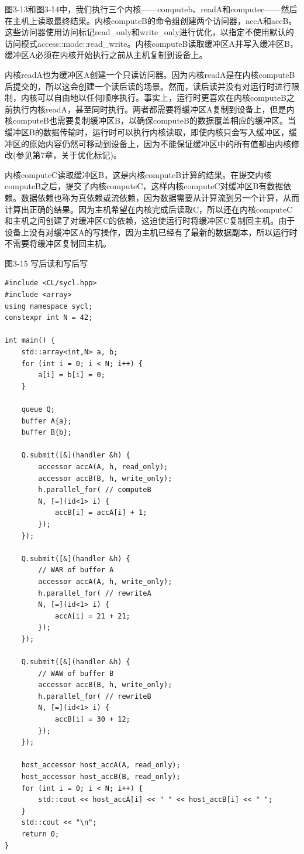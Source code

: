 图3-13和图3-14中，我们执行三个内核——computeb、readA和computec——然后在主机上读取最终结果。内核computeB的命令组创建两个访问器，accA和accB。这些访问器使用访问标记read\_only和write\_only进行优化，以指定不使用默认的访问模式access::mode::read\_write。内核computeB读取缓冲区A并写入缓冲区B，缓冲区A必须在内核开始执行之前从主机复制到设备上。\par

内核readA也为缓冲区A创建一个只读访问器。因为内核readA是在内核computeB后提交的，所以这会创建一个读后读的场景。然而，读后读并没有对运行时进行限制，内核可以自由地以任何顺序执行。事实上，运行时更喜欢在内核computeB之前执行内核readA，甚至同时执行。两者都需要将缓冲区A复制到设备上，但是内核computeB也需要复制缓冲区B，以确保computeB的数据覆盖相应的缓冲区。当缓冲区B的数据传输时，运行时可以执行内核读取，即使内核只会写入缓冲区，缓冲区的原始内容仍然可移动到设备上，因为不能保证缓冲区中的所有值都由内核修改(参见第7章，关于优化标记)。\par

内核computeC读取缓冲区B，这是内核computeB计算的结果。在提交内核computeB之后，提交了内核computeC，这样内核computeC对缓冲区B有数据依赖。数据依赖也称为真依赖或流依赖，因为数据需要从计算流到另一个计算，从而计算出正确的结果。因为主机希望在内核完成后读取C，所以还在内核computeC和主机之间创建了对缓冲区C的依赖，这迫使运行时将缓冲区C复制回主机。由于设备上没有对缓冲区A的写操作，因为主机已经有了最新的数据副本，所以运行时不需要将缓冲区复制回主机。\par

\hspace*{\fill} \par %
图3-15 写后读和写后写
\begin{lstlisting}[caption={}]
#include <CL/sycl.hpp>
#include <array>
using namespace sycl;
constexpr int N = 42;

int main() {
	std::array<int,N> a, b;
	for (int i = 0; i < N; i++) {
		a[i] = b[i] = 0;
	}

	queue Q;
	buffer A{a};
	buffer B{b};
	
	Q.submit([&](handler &h) {
		accessor accA(A, h, read_only);
		accessor accB(B, h, write_only);
		h.parallel_for( // computeB
		N, [=](id<1> i) {
			accB[i] = accA[i] + 1;
		});
	});

	Q.submit([&](handler &h) {
		// WAR of buffer A
		accessor accA(A, h, write_only);
		h.parallel_for( // rewriteA
		N, [=](id<1> i) {
			accA[i] = 21 + 21;
		});
	});

	Q.submit([&](handler &h) {
		// WAW of buffer B
		accessor accB(B, h, write_only);
		h.parallel_for( // rewriteB
		N, [=](id<1> i) {
			accB[i] = 30 + 12;
		});
	});

	host_accessor host_accA(A, read_only);
	host_accessor host_accB(B, read_only);
	for (int i = 0; i < N; i++) {
		std::cout << host_accA[i] << " " << host_accB[i] << " ";
	}
	std::cout << "\n";
	return 0;
}
\end{lstlisting}

